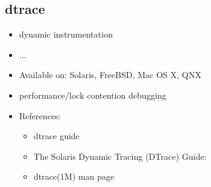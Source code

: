 
\subsection{dtrace}

\begin{itemize}
\item dynamic instrumentation
\item ...
\item Available on: Solaris, FreeBSD, Mac OS X, QNX
\item performance/lock contention debugging
\end{itemize}


\begin{itemize}
\item References:
  \begin{itemize}
  \item dtrace guide
  \item The Solaris Dynamic Tracing (DTrace) Guide:
  \item dtrace(1M) man page
  \end{itemize}
\end{itemize}

\endinput
